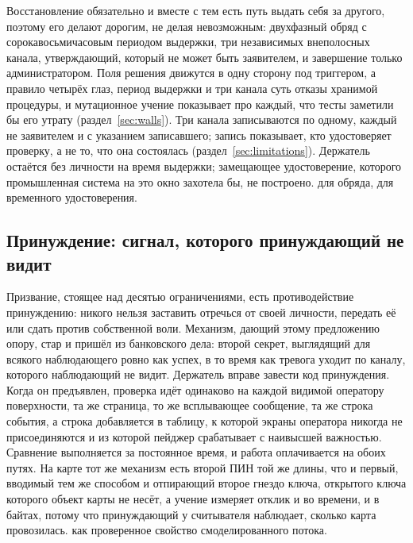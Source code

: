 \begin{description}
    Восстановление обязательно и вместе с тем есть путь выдать себя за другого, поэтому его делают
    дорогим, не делая невозможным: двухфазный обряд с сорокавосьмичасовым периодом выдержки, три
    независимых внеполосных канала, утверждающий, который не может быть заявителем, и завершение
    только администратором. Поля решения движутся в одну сторону под триггером, а правило
    четырёх глаз, период выдержки и три канала суть отказы хранимой процедуры, и мутационное учение
    показывает про каждый, что тесты заметили бы его утрату (раздел~\ref{sec:walls}). Три канала
    записываются по одному, каждый не заявителем и с указанием записавшего; запись показывает, кто
    удостоверяет проверку, а не то, что она состоялась (раздел~\ref{sec:limitations}). Держатель остаётся без личности на время выдержки; замещающее
    удостоверение, которого промышленная система на это окно захотела бы, не построено. \sImplMark{}
    для обряда, \sFut{} для временного удостоверения.
\end{description}

\subsection{Принуждение: сигнал, которого принуждающий не видит}

Призвание, стоящее над десятью ограничениями, есть противодействие принуждению: никого нельзя
заставить отречься от своей личности, передать её или сдать против собственной воли. Механизм,
дающий этому предложению опору, стар и пришёл из банковского дела: второй секрет, выглядящий для
всякого наблюдающего ровно как успех, в то время как тревога уходит по каналу, которого
наблюдающий не видит. Держатель вправе завести код принуждения. Когда он предъявлен, проверка идёт
одинаково на каждой видимой оператору поверхности, та же страница, то же всплывающее сообщение, та
же строка события, а строка  добавляется в таблицу, к которой экраны оператора
никогда не присоединяются и из которой пейджер срабатывает с наивысшей важностью. Сравнение
выполняется за постоянное время, и работа оплачивается на обоих путях. На карте тот же механизм
есть второй ПИН той же длины, что и первый, вводимый тем же способом и отпирающий второе гнездо
ключа, открытого ключа которого объект карты не несёт, а учение измеряет отклик и во времени, и в
байтах, потому что принуждающий у считывателя наблюдает, сколько карта провозилась. \sImplMark{} как
проверенное свойство смоделированного потока.

